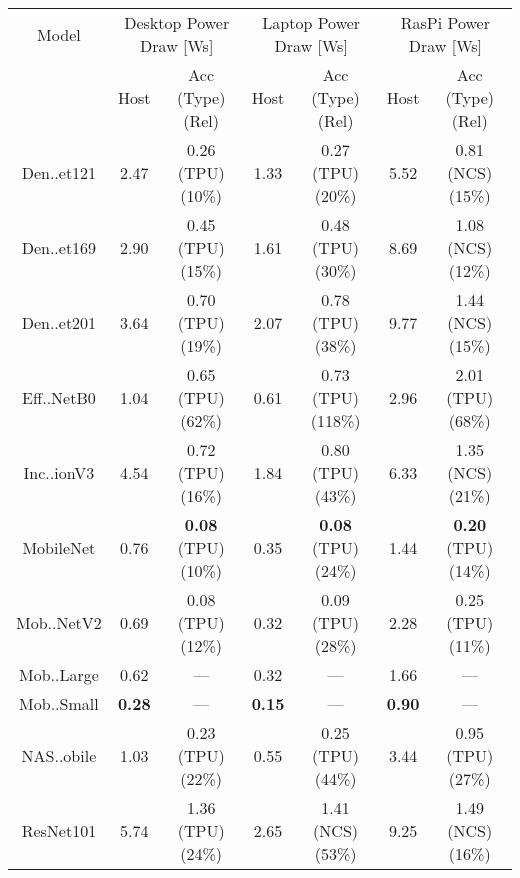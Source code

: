 \begin{tabular}{c|cc|cc|cc}
        Model & \multicolumn{2}{c}{Desktop Power Draw [Ws]} & \multicolumn{2}{c}{Laptop Power Draw [Ws]} & \multicolumn{2}{c}{RasPi Power Draw [Ws]} \\
         & Host & Acc (Type) (Rel) & Host & Acc (Type) (Rel) & Host & Acc (Type) (Rel) \\
         \midrule
        Den..et121 & 2.47 & 0.26 (\colorbox{RC}{TPU}) (\colorbox{RA}{10\%}) & 1.33 & 0.27 (\colorbox{RC}{TPU}) (\colorbox{RC}{20\%}) & 5.52 & 0.81 (\colorbox{RA}{NCS}) (\colorbox{RA}{15\%}) \\
        Den..et169 & 2.90 & 0.45 (\colorbox{RC}{TPU}) (\colorbox{RC}{15\%}) & 1.61 & 0.48 (\colorbox{RC}{TPU}) (\colorbox{RC}{30\%}) & 8.69 & 1.08 (\colorbox{RA}{NCS}) (\colorbox{RA}{12\%}) \\
        Den..et201 & 3.64 & 0.70 (\colorbox{RC}{TPU}) (\colorbox{RC}{19\%}) & 2.07 & 0.78 (\colorbox{RC}{TPU}) (\colorbox{RC}{38\%}) & 9.77 & 1.44 (\colorbox{RA}{NCS}) (\colorbox{RA}{15\%}) \\
        Eff..NetB0 & 1.04 & 0.65 (\colorbox{RC}{TPU}) (\colorbox{RE}{62\%}) & 0.61 & 0.73 (\colorbox{RC}{TPU}) (\colorbox{RE}{118\%}) & 2.96 & 2.01 (\colorbox{RC}{TPU}) (\colorbox{RE}{68\%}) \\
        Inc..ionV3 & 4.54 & 0.72 (\colorbox{RC}{TPU}) (\colorbox{RC}{16\%}) & 1.84 & 0.80 (\colorbox{RC}{TPU}) (\colorbox{RC}{43\%}) & 6.33 & 1.35 (\colorbox{RA}{NCS}) (\colorbox{RC}{21\%}) \\
        MobileNet & 0.76 & \textbf{0.08} (\colorbox{RC}{TPU}) (\colorbox{RA}{10\%}) & 0.35 & \textbf{0.08} (\colorbox{RC}{TPU}) (\colorbox{RC}{24\%}) & 1.44 & \textbf{0.20} (\colorbox{RC}{TPU}) (\colorbox{RA}{14\%}) \\
        Mob..NetV2 & 0.69 & 0.08 (\colorbox{RC}{TPU}) (\colorbox{RA}{12\%}) & 0.32 & 0.09 (\colorbox{RC}{TPU}) (\colorbox{RC}{28\%}) & 2.28 & 0.25 (\colorbox{RC}{TPU}) (\colorbox{RA}{11\%}) \\
        Mob..Large & 0.62 & --- & 0.32 & --- & 1.66 & --- \\
        Mob..Small & \textbf{0.28}  & --- & \textbf{0.15}  & --- & \textbf{0.90}  & --- \\
        NAS..obile & 1.03 & 0.23 (\colorbox{RC}{TPU}) (\colorbox{RC}{22\%}) & 0.55 & 0.25 (\colorbox{RC}{TPU}) (\colorbox{RC}{44\%}) & 3.44 & 0.95 (\colorbox{RC}{TPU}) (\colorbox{RC}{27\%}) \\
        ResNet101 & 5.74 & 1.36 (\colorbox{RC}{TPU}) (\colorbox{RC}{24\%}) & 2.65 & 1.41 (\colorbox{RA}{NCS}) (\colorbox{RC}{53\%}) & 9.25 & 1.49 (\colorbox{RA}{NCS}) (\colorbox{RC}{16\%}) \\

\end{tabular}
